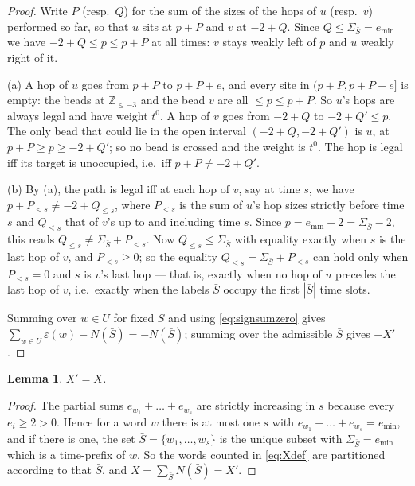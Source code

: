 \documentclass[11pt]{article}
\newtheorem{lemma}[theorem]{Lemma}
\theoremstyle{definition}
\newcommand{\Z}{\mathbb{Z}}
\begin{document}
\begin{proof}
Write $P$ (resp.\ $Q$) for the sum of the sizes of the hops of $u$ (resp.\ $v$) performed
so far, so that $u$ sits at $p+P$ and $v$ at $-2+Q$.  Since $Q\le\Sigma_{\bar S}=e_{\min}$
we have $-2+Q\le p\le p+P$ at all times: $v$ stays weakly left of $p$ and $u$ weakly
right of it.

(a) A hop of $u$ goes from $p+P$ to $p+P+e$, and every site in $(p+P,p+P+e]$ is empty:
the beads at $\Z_{\le-3}$ and the bead $v$ are all $\le p\le p+P$.  So $u$'s hops are
always legal and have weight $t^0$.  A hop of $v$ goes from $-2+Q$ to $-2+Q'\le p$.  The
only bead that could lie in the open interval $(-2+Q,-2+Q')$ is $u$, at $p+P\ge p\ge-2+Q'$;
so no bead is crossed and the weight is $t^0$.  The hop is legal iff its target is
unoccupied, i.e.\ iff $p+P\ne-2+Q'$.

(b) By (a), the path is legal iff at each hop of $v$, say at time $s$, we have
$p+P_{<s}\ne-2+Q_{\le s}$, where $P_{<s}$ is the sum of $u$'s hop sizes strictly before
time $s$ and $Q_{\le s}$ that of $v$'s up to and including time $s$.  Since
$p=e_{\min}-2=\Sigma_{\bar S}-2$, this reads $Q_{\le s}\ne\Sigma_{\bar S}+P_{<s}$.  Now
$Q_{\le s}\le\Sigma_{\bar S}$ with equality exactly when $s$ is the last hop of $v$, and
$P_{<s}\ge0$; so the equality $Q_{\le s}=\Sigma_{\bar S}+P_{<s}$ can hold only when
$P_{<s}=0$ and $s$ is $v$'s last hop --- that is, exactly when no hop of $u$ precedes the
last hop of $v$, i.e.\ exactly when the labels $\bar S$ occupy the first $|\bar S|$ time
slots.

Summing over $w\in U$ for fixed $\bar S$ and using \eqref{eq:signsumzero} gives
$\sum_{w\in U}\varepsilon(w)-N(\bar S)=-N(\bar S)$; summing over the admissible $\bar S$
gives $-X'$.
\end{proof}

\begin{lemma}\label{lem:XX}
$X'=X$.
\end{lemma}

\begin{proof}
The partial sums $e_{w_1}+\dots+e_{w_s}$ are strictly increasing in $s$ because every
$e_i\ge2>0$.  Hence for a word $w$ there is at most one $s$ with
$e_{w_1}+\dots+e_{w_s}=e_{\min}$, and if there is one, the set
$\bar S=\{w_1,\dots,w_s\}$ is the unique subset with $\Sigma_{\bar S}=e_{\min}$ which is a
time-prefix of $w$.  So the words counted in \eqref{eq:Xdef} are partitioned according to
that $\bar S$, and $X=\sum_{\bar S}N(\bar S)=X'$.
\end{proof}
\end{document}

